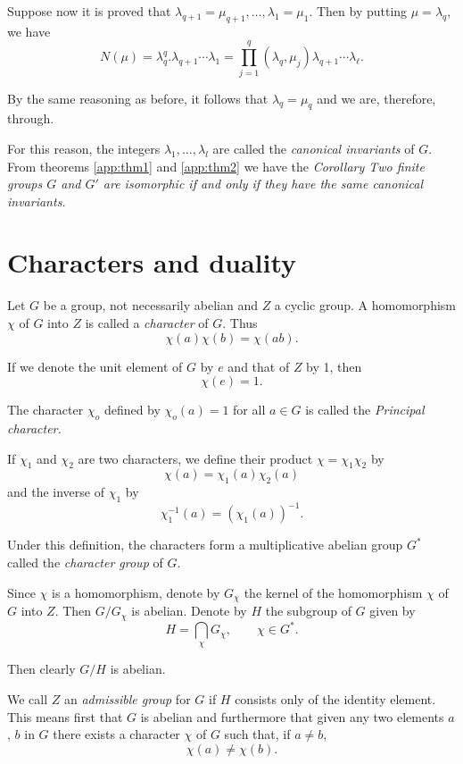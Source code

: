 Suppose now it is proved that $\lambda_{q+1} = \mu_{q+1} ,\ldots,
\lambda_1 = \mu_1$. Then by putting $\mu= \lambda_q$, we have  
$$
N(\mu) = \lambda^q_q. \lambda_{q+1} \cdots \lambda_1 = \prod^q_{j=1}
(\lambda_q , \mu_j) \lambda_{q+1} \cdots \lambda_\ell . 
$$

By the same reasoning as before, it follows that $\lambda_q = \mu_q$
and we are, therefore, through. 

For this reason, the integers $\lambda_1 ,\ldots , \lambda_l$ are
called the \textit{canonical invariants} of $G$. From theorems
\ref{app:thm1} and \ref{app:thm2} we have the \textit{Corollary Two
  finite groups $G$ and $G'$ are 
  isomorphic if and only if they have the same canonical invariants. } 

\section{Characters and duality}\pageoriginale %

Let $G$ be a group, not necessarily abelian and $Z$ a cyclic group. A
homomorphism $\chi$ of $G$ into $Z$ is called a  \textit{character} of
$G$. Thus 
$$
\chi (a) \chi(b) = \chi (ab).
$$

If we denote the unit element of $G$ by $e$ and that of $Z$ by 1, then
$$
\chi (e) = 1.
$$

The character $\chi_o$ defined by $\chi_o (a) =1$ for all $a \in G$ is
called the \textit{Principal character.} 

If $\chi_1$ and $\chi_2$ are two characters, we define their product
$\chi = \chi_1 \chi_2$ by 
$$
\chi(a) = \chi_1 (a) \chi_2 (a)
$$
and the inverse of $\chi_1$  by 
$$
\chi^{-1}_1 (a) = (\chi_1 (a) )^{-1}.
$$

Under this definition, the characters form  a multiplicative abelian
group $G^*$ called the \textit{character group} of $G$. 

Since $\chi$ is a homomorphism, denote by $G_{\chi}$ the kernel of the
homomorphism $\chi$ of $G$ into $Z$. Then $G/G_{\chi}$ is
abelian. Denote by $H$ the subgroup of $G$ given by 
$$
H = \bigcap_\chi G_\chi, \qquad \chi \in G^*.
$$

Then clearly $G/H$ is abelian. 

We call $Z$ an \textit{admissible group} for $G$ if $H$ consists only
of the identity element. This means first that $G$ is abelian and
\pageoriginale furthermore that given any two elements $a$, $b$ in $G$
there exists a character $\chi$ of $G$ such that, if $a \neq b$,  
$$
\chi (a) \neq \chi (b).
$$

